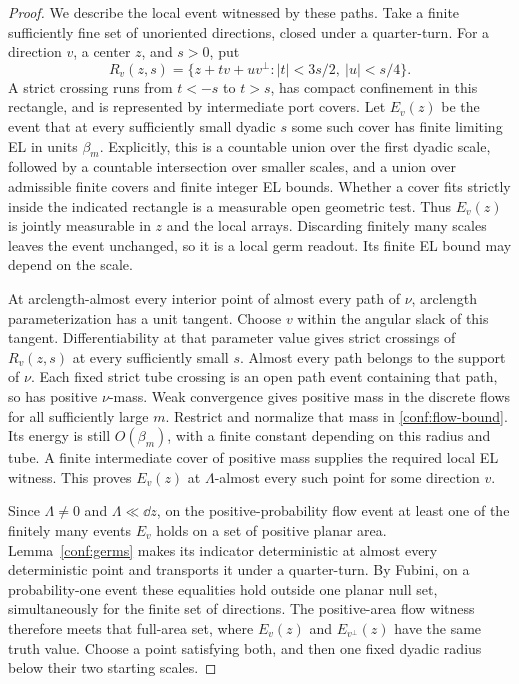 \begin{proof}
We describe the local event witnessed by these paths.  Take a finite
sufficiently fine set of unoriented directions, closed under a
quarter-turn.  For a direction \(v\), a center \(z\), and
\(s>0\), put
\[
 R_v(z,s)=\{z+t v+u v^\perp: |t|<3s/2,\ |u|<s/4\}.
\]
A strict crossing runs from \(t<-s\) to \(t>s\), has compact
confinement in this rectangle, and is represented by intermediate
port covers.  Let \(E_v(z)\) be the event that at every sufficiently
small dyadic \(s\) some such cover has finite limiting EL in units
\(\beta_m\).  Explicitly, this is a countable union over the first
dyadic scale, followed by a countable intersection over smaller
scales, and a union over admissible finite covers and finite integer
EL bounds.  Whether a cover fits strictly inside the indicated
rectangle is a measurable open geometric test.  Thus \(E_v(z)\)
is jointly measurable in \(z\) and the local arrays.  Discarding
finitely many scales leaves the event unchanged, so it is a local
germ readout.  Its finite EL bound may depend on the scale.

At arclength-almost every interior point of almost every path of
\(\nu\), arclength parameterization has a unit tangent.  Choose
\(v\) within the angular slack of this tangent.  Differentiability
at that parameter value gives strict crossings of \(R_v(z,s)\)
at every sufficiently small \(s\).  Almost every path belongs to
the support of \(\nu\).  Each fixed strict tube crossing is an
open path event containing that path, so has positive \(\nu\)-mass.
Weak convergence gives positive mass in the discrete flows for all
sufficiently large \(m\).  Restrict and normalize that mass in
\eqref{conf:flow-bound}.  Its energy is still \(O(\beta_m)\), with
a finite constant depending on this radius and tube.  A finite
intermediate cover of positive mass supplies the required local EL
witness.  This proves \(E_v(z)\) at \(\Lambda\)-almost every
such point for some direction \(v\).

Since \(\Lambda\ne0\) and \(\Lambda\ll\dd z\), on the
positive-probability flow event at least one of the finitely many
events \(E_v\) holds on a set of positive planar area.
Lemma~\ref{conf:germs} makes its indicator deterministic at almost
every deterministic point and transports it under a quarter-turn.
By Fubini, on a probability-one event these equalities hold outside
one planar null set, simultaneously for the finite set of directions.
The positive-area flow witness therefore meets that full-area set,
where \(E_v(z)\) and \(E_{v^\perp}(z)\) have the same truth
value.  Choose a point satisfying both, and then one fixed dyadic
radius below their two starting scales.


\end{proof}
